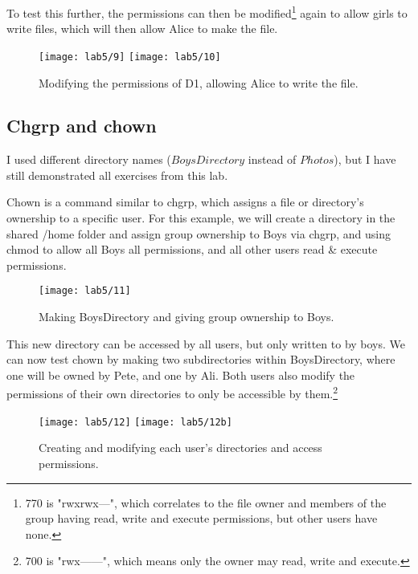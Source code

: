 To test this further, the permissions can then be modified\footnote{770 is "rwxrwx---", which
correlates to the file owner and members of the group having read, write and execute permissions, but other users have none.}
again to allow girls to write files, which will then allow Alice to make the file.

\begin{figure}[H]
    \centering
    \texttt{[image: lab5/9]}
    \texttt{[image: lab5/10]}
    \caption{Modifying the permissions of D1, allowing Alice to write the file.}
    \label{fig:girlsWriteD1Success}
\end{figure}

\pagebreak

\subsection{Chgrp and chown}\label{subsec:using-chown}
\begin{tcolorbox}[colback=orange!5!white,colframe=orange!75!black,title=Note]
    I used different directory names ($BoysDirectory$ instead of $Photos$),
    but I have still demonstrated all exercises from this lab.
\end{tcolorbox}
Chown is a command similar to chgrp, which assigns a file or directory's ownership
to a specific user.
For this example, we will create a directory in the shared /home folder and assign group ownership
to Boys via chgrp, and using chmod to allow all Boys all permissions, and all other users
read \& execute permissions.

\begin{figure}[H]
    \centering
    \texttt{[image: lab5/11]}
    \caption{Making BoysDirectory and giving group ownership to Boys.}
    \label{fig:BoysDirectory}
\end{figure}

This new directory can be accessed by all users, but only written to by boys.
We can now test chown by making two subdirectories within BoysDirectory, where one will be owned
by Pete, and one by Ali.
Both users also modify the permissions of their own directories to only be accessible
by them.\footnote{700 is "rwx------", which means only the owner may read,
write and execute.}

\begin{figure}[H]
    \centering
    \texttt{[image: lab5/12]}
    \texttt{[image: lab5/12b]}
    \caption{Creating and modifying each user's directories and access permissions.}
    \label{fig:PeteAliDir}
\end{figure}


